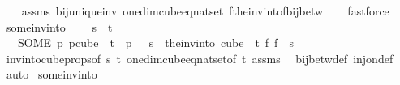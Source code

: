 \begin{isabellebody}
%
\isadelimproof
\ \ %
\endisadelimproof
%
\isatagproof
{}\isamarkupfalse%
\ assms\ bij{\isacharunderscore}{\kern0pt}unique{\isacharunderscore}{\kern0pt}inv\ one{\isacharunderscore}{\kern0pt}dim{\isacharunderscore}{\kern0pt}cube{\isacharunderscore}{\kern0pt}eq{\isacharunderscore}{\kern0pt}nat{\isacharunderscore}{\kern0pt}set\ f{\isacharunderscore}{\kern0pt}the{\isacharunderscore}{\kern0pt}inv{\isacharunderscore}{\kern0pt}into{\isacharunderscore}{\kern0pt}f{\isacharunderscore}{\kern0pt}bij{\isacharunderscore}{\kern0pt}betw\isanewline
\ \ \isamarkupfalse%
\ fastforce{\isacharplus}{\kern0pt}%
\endisatagproof
{\isafoldproof}%
%
\isadelimproof
\isanewline
%
\endisadelimproof
\isanewline
{}\isamarkupfalse%
\ some{\isacharunderscore}{\kern0pt}inv{\isacharunderscore}{\kern0pt}into{\isacharcolon}{\kern0pt}\ \isanewline
\ \ \ {\isachardoublequoteopen}s\ {\isacharless}{\kern0pt}\ t{\isachardoublequoteclose}\ \isanewline
\ \ \ {\isachardoublequoteopen}{\isacharparenleft}{\kern0pt}SOME\ p{\isachardot}{\kern0pt}\ p{\isasymin}cube\ {}\ t\ {\isasymand}\ p\ {}\ {\isacharequal}{\kern0pt}\ s{\isacharparenright}{\kern0pt}\ {\isacharequal}{\kern0pt}\ {\isacharparenleft}{\kern0pt}the{\isacharunderscore}{\kern0pt}inv{\isacharunderscore}{\kern0pt}into\ {\isacharparenleft}{\kern0pt}cube\ {}\ t{\isacharparenright}{\kern0pt}\ {\isacharparenleft}{\kern0pt}{\isasymlambda}f{\isachardot}{\kern0pt}\ f\ {}{\isacharparenright}{\kern0pt}\ s{\isacharparenright}{\kern0pt}{\isachardoublequoteclose}\isanewline
%
\isadelimproof
\ \ %
\endisadelimproof
%
\isatagproof
{}\isamarkupfalse%
\ inv{\isacharunderscore}{\kern0pt}into{\isacharunderscore}{\kern0pt}cube{\isacharunderscore}{\kern0pt}props{\isacharbrackleft}{\kern0pt}of\ s\ t{\isacharbrackright}{\kern0pt}\ one{\isacharunderscore}{\kern0pt}dim{\isacharunderscore}{\kern0pt}cube{\isacharunderscore}{\kern0pt}eq{\isacharunderscore}{\kern0pt}nat{\isacharunderscore}{\kern0pt}set{\isacharbrackleft}{\kern0pt}of\ t{\isacharbrackright}{\kern0pt}\ assms\ \isamarkupfalse%
\ bij{\isacharunderscore}{\kern0pt}betw{\isacharunderscore}{\kern0pt}def\ inj{\isacharunderscore}{\kern0pt}on{\isacharunderscore}{\kern0pt}def\ \isamarkupfalse%
\ auto%
\endisatagproof
{\isafoldproof}%
%
\isadelimproof
\isanewline
%
\endisadelimproof
\isanewline
{}\isamarkupfalse%
\ some{\isacharunderscore}{\kern0pt}inv{\isacharunderscore}{\kern0pt}into{\isacharunderscore}{\kern0pt}{}{\isacharcolon}{\kern0pt}\ \isanewline

\end{isabellebody}
